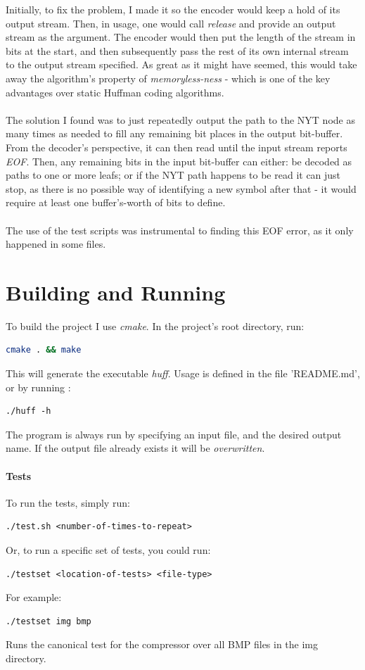 \documentclass[]{article}
\begin{document}
Initially, to fix the problem, I made it so the encoder would keep a hold of its output stream. Then, in usage, one would call \emph{release} and provide an output stream as the argument. The encoder would then put the length of the stream in bits at the start, and then subsequently pass the rest of its own internal stream to the output stream specified. As great as it might have seemed, this would take away the algorithm's property of \emph{memoryless-ness} - which is one of the key advantages over static Huffman coding algorithms.
\\\\
The solution I found was to just repeatedly output the path to the NYT node as many times as needed to fill any remaining bit places in the output bit-buffer. From the decoder's perspective, it can then read until the input stream reports \emph{EOF}. Then, any remaining bits in the input bit-buffer can either: be decoded as paths to one or more leafs; or if the NYT path happens to be read it can just stop, as there is no possible way of identifying a new symbol after that - it would require at least one buffer's-worth of bits to define.
\\\\
The use of the test scripts was instrumental to finding this EOF error, as it only happened in some files.
\section{Building and Running}
To build the project I use \emph{cmake}. In the project's root directory, run:
\begin{lstlisting}[language=bash]
cmake . && make
\end{lstlisting}
This will generate the executable \emph{huff}. Usage is defined in the file 'README.md', or by running :
\begin{lstlisting}
./huff -h
\end{lstlisting}
The program is always run by specifying an input file, and the desired output name. If the output file already exists it will be \emph{overwritten}.
\paragraph{Tests} To run the tests, simply run:
\begin{lstlisting}
./test.sh <number-of-times-to-repeat>
\end{lstlisting}
Or, to run a specific set of tests, you could run:
\begin{lstlisting}
./testset <location-of-tests> <file-type>
\end{lstlisting}
For example:
\begin{lstlisting}
./testset img bmp
\end{lstlisting}
Runs the canonical test for the compressor over all BMP files in the img directory.
\end{document}
